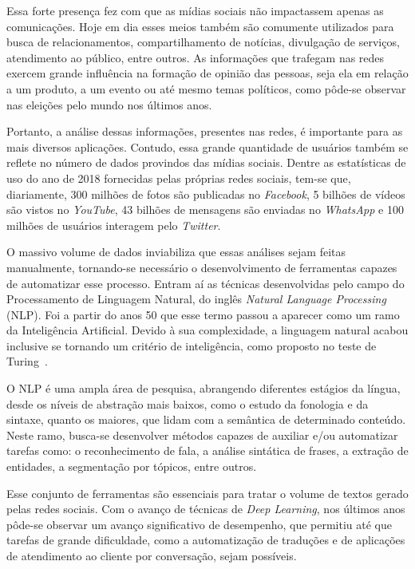 Essa forte presença fez com que as mídias sociais não impactassem apenas as
comunicações.
Hoje em dia esses meios também são comumente utilizados para busca de
relacionamentos, compartilhamento de notícias, divulgação de serviços,
atendimento ao público, entre outros.
As informações que trafegam nas redes exercem grande influência na formação de
opinião das pessoas, seja ela em relação a um produto, a um evento ou até mesmo
temas políticos, como pôde-se observar nas eleições pelo mundo nos últimos anos.

Portanto, a análise dessas informações, presentes nas redes, é importante para
as mais diversos aplicações.
Contudo, essa grande quantidade de usuários também se reflete no número de dados
provindos das mídias sociais.
Dentre as estatísticas de uso do ano de 2018 fornecidas pelas próprias redes
sociais, tem-se que, diariamente, 300 milhões de fotos são publicadas no
\textit{Facebook}, 5 bilhões de vídeos são vistos no \textit{YouTube}, 43
bilhões de mensagens são enviadas no \textit{WhatsApp} e 100 milhões de usuários
interagem pelo \textit{Twitter}.

O massivo volume de dados inviabiliza que essas análises sejam feitas
manualmente, tornando-se necessário o desenvolvimento de ferramentas capazes de
automatizar esse processo.
Entram aí as técnicas desenvolvidas pelo campo do Processamento de Linguagem
Natural, do inglês \textit{Natural Language Processing} (NLP).
Foi a partir do anos 50 que esse termo passou a aparecer como um ramo da
Inteligência Artificial.
Devido à sua complexidade, a linguagem natural acabou inclusive se tornando um
critério de inteligência, como proposto no teste de Turing~\cite{turing50}.

O NLP é uma ampla área de pesquisa, abrangendo diferentes estágios da língua,
desde os níveis de abstração mais baixos, como o estudo da fonologia e da
sintaxe, quanto os maiores, que lidam com a semântica de determinado conteúdo.
Neste ramo, busca-se desenvolver métodos capazes de auxiliar e/ou automatizar
tarefas como: o reconhecimento de fala, a análise sintática de frases, a
extração de entidades, a segmentação por tópicos, entre outros.

Esse conjunto de ferramentas são essenciais para tratar o volume de textos
gerado pelas redes sociais.  Com o avanço de técnicas de \textit{Deep Learning},
nos últimos anos pôde-se observar um avanço significativo de desempenho, que
permitiu até que tarefas de grande dificuldade, como a automatização de traduções
e de aplicações de atendimento ao cliente por conversação, sejam possíveis.

